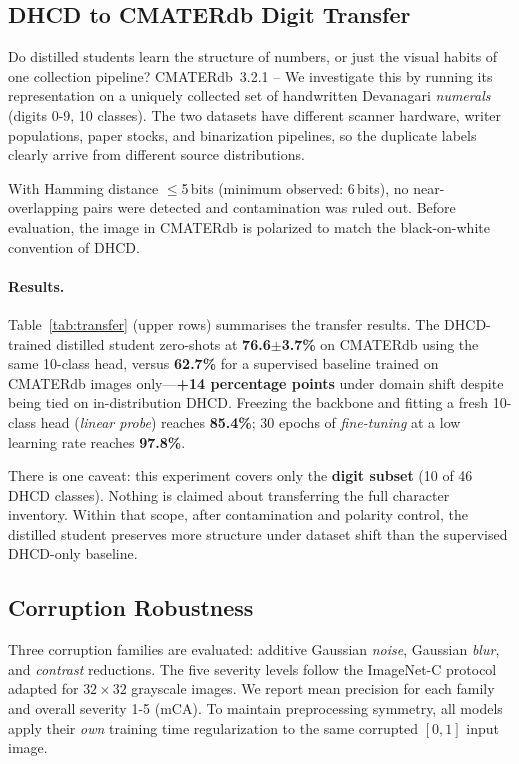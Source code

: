 \subsection{DHCD to CMATERdb Digit Transfer}
\label{sec:transfer}

Do distilled students learn the structure of numbers, or just the visual habits of one collection pipeline? CMATERdb~3.2.1 \cite{das2012cmaterdb} -- We investigate this by running its representation on a uniquely collected set of handwritten Devanagari \emph{numerals} (digits 0-9, 10 classes). The two datasets have different scanner hardware, writer populations, paper stocks, and binarization pipelines, so the duplicate labels clearly arrive from different source distributions.

With Hamming distance $\leq$5\,bits (minimum observed: 6\,bits), no near-overlapping pairs were detected and contamination was ruled out. Before evaluation, the image in CMATERdb is polarized to match the black-on-white convention of DHCD.

\paragraph{Results.} Table~\ref{tab:transfer} (upper rows) summarises the transfer results. The DHCD-trained distilled student zero-shots at \textbf{76.6$\pm$3.7\%} on CMATERdb using the same 10-class head, versus \textbf{62.7\%} for a supervised baseline trained on CMATERdb images only---\textbf{+14 percentage points} under domain shift despite being tied on in-distribution DHCD. Freezing the backbone and fitting a fresh 10-class head (\emph{linear probe}) reaches \textbf{85.4\%}; 30 epochs of \emph{fine-tuning} at a low learning rate reaches \textbf{97.8\%}.

There is one caveat: this experiment covers only the \textbf{digit subset} (10 of 46 DHCD classes). Nothing is claimed about transferring the full character inventory. Within that scope, after contamination and polarity control, the distilled student preserves more structure under dataset shift than the supervised DHCD-only baseline.

\subsection{Corruption Robustness}
\label{sec:robustness}

Three corruption families are evaluated: additive Gaussian \emph{noise}, Gaussian \emph{blur}, and \emph{contrast} reductions. The five severity levels follow the ImageNet-C protocol adapted for $32{\times}32$ grayscale images. We report mean precision for each family and overall severity 1-5 (mCA). To maintain preprocessing symmetry, all models apply their \emph{own} training time regularization to the same corrupted $[0,1]$ input image.

